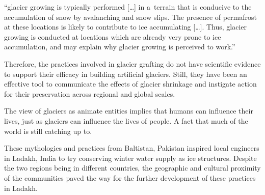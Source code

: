 \begin{thesis_quotation}

“glacier growing is typically performed […] in a terrain that is conducive to the accumulation of snow by
avalanching and snow slips. The presence of permafrost at these locations is likely to contribute to ice
accumulating […]. Thus, glacier growing is conducted at locations which are already very prone to ice
accumulation, and may explain why glacier growing is perceived to work.” 

\end{thesis_quotation}

Therefore, the practices involved in glacier grafting do not have scientific evidence to support their efficacy
in building artificial glaciers. Still, they have been an effective tool to communicate the effects of glacier
shrinkage and instigate action for their preservation across regional and global scales. 

The view of glaciers as animate entities implies that humans can influence their lives, just as glaciers can
influence the lives of people. A fact that much of the world is still catching up to.

These mythologies and practices from Baltistan, Pakistan inspired local engineers in Ladakh, India to try
conserving winter water supply as ice structures. Despite the two regions being in different countries, the
geographic and cultural proximity of the communities paved the way for the further development of these
practices in Ladakh.
